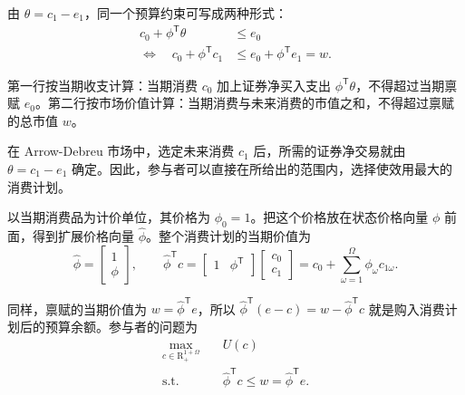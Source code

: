 \begin{tcolorbox}[knowledge,title=价值预算约束]
由 $\theta=c_1-e_1$，同一个预算约束可写成两种形式：
\begin{equation}
 \begin{aligned}
 c_0+\phi^{\mathsf T}\theta&\le e_0\\
 \Longleftrightarrow\quad c_0+\phi^{\mathsf T}c_1
 &\le e_0+\phi^{\mathsf T}e_1=w.
 \end{aligned}\label{eq:wj-three-budget}
\end{equation}

第一行按当期收支计算：当期消费 $c_0$ 加上证券净买入支出 $\phi^{\mathsf T}\theta$，不得超过当期禀赋 $e_0$。第二行按市场价值计算：当期消费与未来消费的市值之和，不得超过禀赋的总市值 $w$。
\end{tcolorbox}

在 Arrow-Debreu 市场中，选定未来消费 $c_1$ 后，所需的证券净交易就由 $\theta=c_1-e_1$ 确定。因此，参与者可以直接在所给出的范围内，选择使效用最大的消费计划。

\begin{tcolorbox}[knowledge,title=扩展价格与消费优化]
以当期消费品为计价单位，其价格为 $\phi_0=1$。把这个价格放在状态价格向量 $\phi$ 前面，得到扩展价格向量 $\hat\phi$。整个消费计划的当期价值为
\[
 \hat\phi=\begin{bmatrix}1\\\phi\end{bmatrix},
 \qquad
 \hat\phi^{\mathsf T}c
 =\begin{bmatrix}1&\phi^{\mathsf T}\end{bmatrix}
   \begin{bmatrix}c_0\\c_1\end{bmatrix}
 =c_0+\sum_{\omega=1}^{\Omega}\phi_\omega c_{1\omega}.
\]

同样，禀赋的当期价值为 $w=\hat\phi^{\mathsf T}e$，所以 $\hat\phi^{\mathsf T}(e-c)=w-\hat\phi^{\mathsf T}c$ 就是购入消费计划后的预算余额。参与者的问题为
\begin{equation}
 \begin{aligned}
 \max_{c\in\mathrm R_+^{1+\Omega}}\quad&U(c)\\
 \mathrm{s.t.}\quad&\hat\phi^{\mathsf T}c\le w=\hat\phi^{\mathsf T}e.
 \end{aligned}\label{eq:wj-three-optimization}
\end{equation}
\end{tcolorbox}

